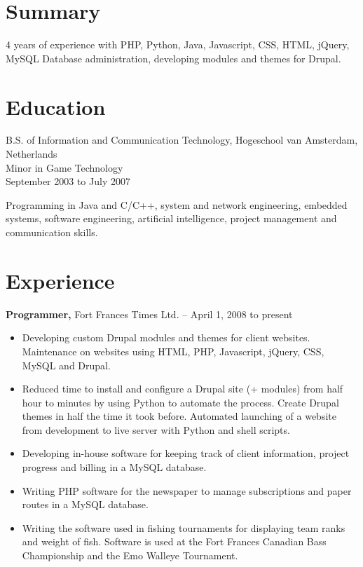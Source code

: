 \documentclass{res}
\begin{document}
\address{Box 241\\Devlin, ON\\P0W 1C0\\(807) 486-1566\\
  bram@vanderkroef.net\\http://www.vanderkroef.net\\github.com/BramvdKroef}

\begin{resume}

\section{Summary}
\label{sec:summary}
 4 years of experience with PHP, Python, Java, Javascript, CSS, HTML,
 jQuery, MySQL Database administration, developing modules and themes
 for Drupal.

\section{Education}
\label{sec:edu}
B.S. of Information and Communication Technology, Hogeschool van
Amsterdam, Netherlands \\
Minor in Game Technology \\
September 2003 to July 2007

Programming in Java and C/C++, system and network engineering,
embedded systems, software engineering, artificial intelligence,
project management and communication skills.
  
\section{Experience}
\label{sec:experience}

{\bf Programmer,} Fort Frances Times Ltd. -- April 1, 2008 to present
\begin{itemize} \itemsep -2pt
\item Developing custom Drupal modules and themes for client
  websites. Maintenance on websites using HTML, PHP, Javascript,
  jQuery, CSS, MySQL and Drupal.
  \item Reduced time to install and configure a Drupal site (+
    modules) from half hour to minutes by using Python to automate the
    process. Create Drupal themes in half the time it took
    before. Automated launching of a website from development to live
    server with Python and shell scripts.
  \item Developing in-house software for keeping track of client
    information, project progress and billing in a MySQL database.
  \item Writing PHP software for the newspaper to manage subscriptions
    and paper routes in a MySQL database.
  \item Writing the software used in fishing tournaments for displaying
    team ranks and weight of fish. Software is used at the Fort Frances
    Canadian Bass Championship and the Emo Walleye Tournament.


\end{itemize}
\end{resume}
\end{document}
